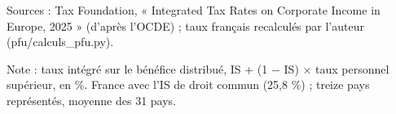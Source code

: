 Sources : Tax Foundation, « Integrated Tax Rates on Corporate Income in Europe, 2025 » (d'après l'OCDE) ; taux français recalculés par l'auteur (pfu/calculs\_pfu.py).\par Note : taux intégré sur le bénéfice distribué, IS + (1 $-$ IS) $\times$ taux personnel supérieur, en \%. France avec l'IS de droit commun (25,8 \%) ; treize pays représentés, moyenne des 31 pays.
